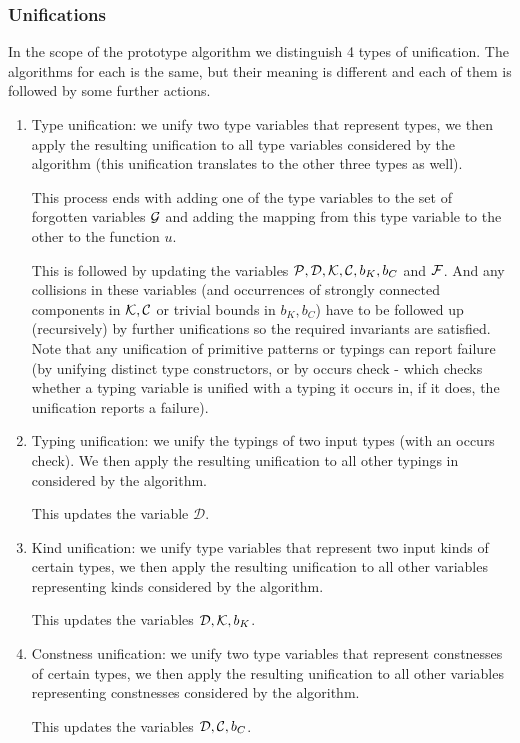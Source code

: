 \subsubsection{Unifications}
\label{unifications}

In the scope of the prototype algorithm we distinguish 4 types of unification. The algorithms for each is the same, but their meaning is different and each of them is followed by some further actions.

\begin{enumerate}
    \item Type unification: we unify two type variables that represent types, we then apply the resulting unification to all type variables considered by the algorithm (this unification translates to the other three types as well). \label{tUni}

    This process ends with adding one of the type variables to the set of forgotten variables $\mathcal G$ and adding the mapping from this type variable to the other to the function $u$.

    This is followed by updating the variables $\mathcal P, \mathcal D, \mathcal K, \mathcal C, b_K, b_C$ and $\mathcal F$. And any collisions in these variables (and occurrences of strongly connected components in $\mathcal K, \mathcal C$ or trivial bounds in $b_K, b_C$) have to be followed up (recursively) by further unifications so the required invariants are satisfied. Note that any unification of primitive patterns or typings can report failure (by unifying distinct type constructors, or by occurs check - which checks whether a typing variable is unified with a typing it occurs in, if it does, the unification reports a failure).

    \item Typing unification: we unify the typings of two input types (with an occurs check). We then apply the resulting unification to all other typings in considered by the algorithm. \label{tyUni}

    This updates the variable $\mathcal D$.

    \item Kind unification: we unify type variables that represent two input kinds of certain types, we then apply the resulting unification to all other variables representing kinds considered by the algorithm. \label{kUni}

    This updates the variables $\mathcal D, \mathcal K, b_K$.

    \item Constness unification: we unify two type variables that represent constnesses of certain types, we then apply the resulting unification to all other variables representing constnesses considered by the algorithm. \label{cUni}

    This updates the variables $\mathcal D, \mathcal C, b_C$.
\end{enumerate}

